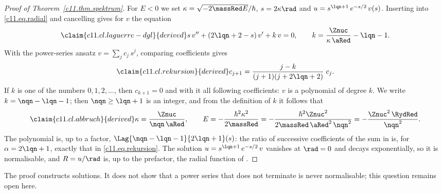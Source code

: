 \begin{vertiefung}
  \begin{proof}[Proof of Theorem~\ref{c11.thm.spektrum}]
    For $E < 0$ we set $\kappa = \sqrt{-2\massRed E}/\hbar$, $s = 2\kappa\rad$ and
    $u = s^{\lqn + 1}\,e^{-s/2}\,v(s)$. Inserting into \eqref{c11.eq.radial} and
    cancelling gives for $v$ the equation
    \begin{equation}\label{c11.eq.laguerre-dgl}\claim{c11.cl.laguerre-dgl}{derived}
      s\,v'' + (2\lqn + 2 - s)\,v' + k\,v = 0,
      \qquad
      k = \frac{\Znuc}{\kappa\,\aRed} - \lqn - 1 .
    \end{equation}
    With the power-series ansatz $v = \sum_j c_j\,s^j$, comparing coefficients gives
    \begin{equation}\label{c11.eq.rekursion}\claim{c11.cl.rekursion}{derived}
      c_{j + 1} = \frac{j - k}{(j + 1)(j + 2\lqn + 2)}\;c_j .
    \end{equation}
    If $k$ is one of the numbers $0, 1, 2, \ldots$, then $c_{k + 1} = 0$ and with it all
    following coefficients: $v$ is a polynomial of degree $k$. We write
    $k = \nqn - \lqn - 1$; then $\nqn \geq \lqn + 1$ is an integer, and from the
    definition of $k$ it follows that
    \begin{equation}\label{c11.eq.abbruch}\claim{c11.cl.abbruch}{derived}
      \kappa = \frac{\Znuc}{\nqn\,\aRed},
      \qquad
      E = -\frac{\hbar^2\kappa^2}{2\massRed}
        = -\frac{\hbar^2\Znuc^2}{2\massRed\,\aRed^2\,\nqn^2}
        = -\frac{\Znuc^2\,\RydRed}{\nqn^2} .
    \end{equation}
    The polynomial is, up to a factor, $\Lag{\nqn - \lqn - 1}{2\lqn + 1}(s)$: the ratio
    of successive coefficients of the sum in  is, for $\alpha = 2\lqn + 1$,
    exactly that in \eqref{c11.eq.rekursion}. The solution
    $u = s^{\lqn + 1}\,e^{-s/2}\,v$ vanishes at $\rad = 0$ and decays exponentially, so
    it is normalisable, and $R = u/\rad$ is, up to the prefactor, the radial function of
    .
  \end{proof}

  The proof constructs solutions. It does not show that a power series that does not
  terminate is never normalisable; this question remains open here.


\end{vertiefung}
